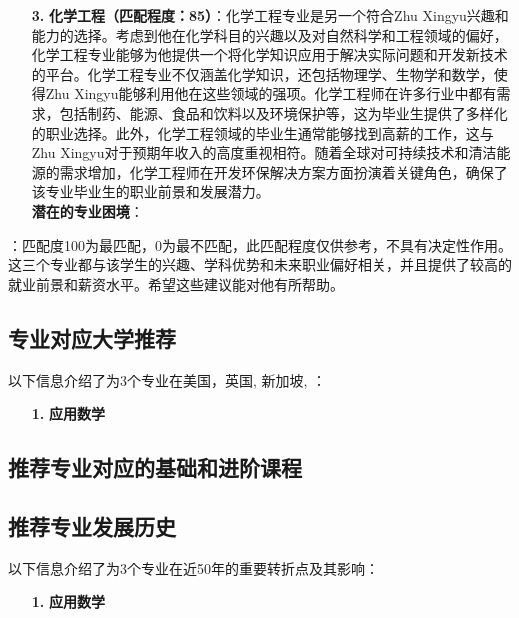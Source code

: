 \documentclass[12pt]{article}
\def\username{Xingyu Zhu\xspace}
\def\majorone{应用数学\xspace}
\def\majorthree{化学工程\xspace}
\def\countryone{美国\xspace}
\def\countrytwo{英国\xspace}
\def\countrythree{新加坡\xspace}
\def\countryfour{香港\xspace}
\begin{document}
\begin{CJK*}{UTF8}{gbsn}
\begin{itemize}[leftmargin=1.5cm]
\newpage
\vfill
    \item[\textbf{3.}]\textbf{\majorthree（匹配程度：85）}：化学工程专业是另一个符合Zhu Xingyu兴趣和能力的选择。考虑到他在化学科目的兴趣以及对自然科学和工程领域的偏好，化学工程专业能够为他提供一个将化学知识应用于解决实际问题和开发新技术的平台。化学工程专业不仅涵盖化学知识，还包括物理学、生物学和数学，使得Zhu Xingyu能够利用他在这些领域的强项。化学工程师在许多行业中都有需求，包括制药、能源、食品和饮料以及环境保护等，这为毕业生提供了多样化的职业选择。此外，化学工程领域的毕业生通常能够找到高薪的工作，这与Zhu Xingyu对于预期年收入的高度重视相符。随着全球对可持续技术和清洁能源的需求增加，化学工程师在开发环保解决方案方面扮演着关键角色，确保了该专业毕业生的职业前景和发展潜力。
    \bigskip \\  \textbf{潜在的专业困境}：
    \begin{itemize}
    \end{itemize}
\end{itemize}
\bigskip
{}：匹配度100为最匹配，0为最不匹配，此匹配程度仅供参考，不具有决定性作用。这三个专业都与该学生的兴趣、学科优势和未来职业偏好相关，并且提供了较高的就业前景和薪资水平。希望这些建议能对他有所帮助。
\vfill


\newpage
\vspace{-2cm}
\subsection*{专业对应大学推荐}
以下信息介绍了为3个专业在\countryone，\countrytwo, \countrythree, ：
\begin{itemize}[leftmargin=1cm]
\item[\textbf{1.}] \textbf{\majorone}
    \bigskip \\
    \bigskip
            \end{itemize}

            
\newpage
\vfill
\subsection*{推荐专业对应的基础和进阶课程}

\vfill
\vfill

\newpage
\vspace{-2cm}
\subsection*{推荐专业发展历史}
以下信息介绍了为3个专业在近50年的重要转折点及其影响：
\begin{itemize}[leftmargin=1cm]
    \item[\textbf{1.}] \textbf{\majorone}
    \bigskip
    \bigskip
\end{itemize}
\vfill


\end{CJK*}
\end{document}
